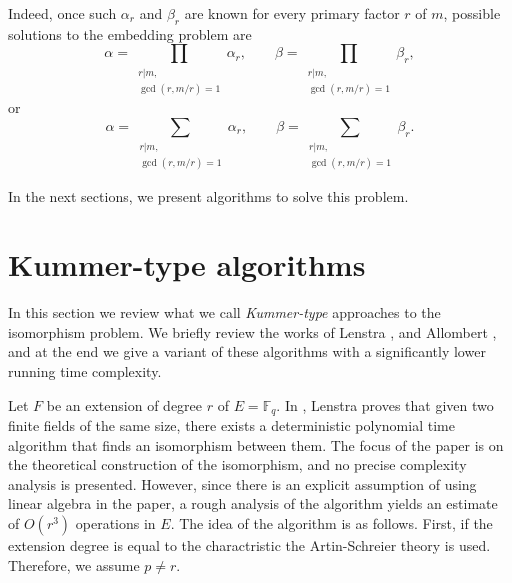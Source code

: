\documentclass[12pt]{article}
\theoremstyle{plain}
\theoremstyle{definition}
\def\F{\ensuremath{\mathbb{F}}}
\newcounter{algorithm}
\begin{document}
Indeed, once such $\alpha_r$ and $\beta_r$ are known for every primary
factor $r$ of $m$, possible solutions to the embedding problem are
\begin{equation*}
  \alpha = \prod_{\substack{r|m,\\\gcd(r,m/r)=1}}\alpha_r,\qquad
  \beta = \prod_{\substack{r|m,\\\gcd(r,m/r)=1}}\beta_r,
\end{equation*}
or
\begin{equation*}
  \alpha = \sum_{\substack{r|m,\\\gcd(r,m/r)=1}}\alpha_r,\qquad
  \beta = \sum_{\substack{r|m,\\\gcd(r,m/r)=1}}\beta_r.
\end{equation*}

In the next sections, we present algorithms to solve this problem.


\section{Kummer-type algorithms}

In this section we review what we call \textit{Kummer-type} approaches to the isomorphism problem. 
We briefly review the works of Lenstra \cite{LenstraJr91}, and Allombert \cite{Allombert02}, and at 
the end we give a variant of these algorithms with a significantly lower running time complexity.

Let $F$ be an extension of degree $r$ of $E = \F_q$. In \cite{LenstraJr91}, Lenstra proves that 
given two finite fields of the same size, there exists a deterministic polynomial time algorithm 
that finds an isomorphism between them. The focus of the paper is on the theoretical construction 
of the isomorphism, and no precise complexity analysis is presented. However, since there is an 
explicit assumption of using linear algebra in the paper, a rough analysis of the algorithm yields 
an estimate of $O(r^3)$ operations in $E$. The idea of the algorithm is as follows. First, if 
the extension degree is equal to the charactristic the Artin-Schreier theory is used. Therefore, we 
assume $p \ne r$.
\end{document}
